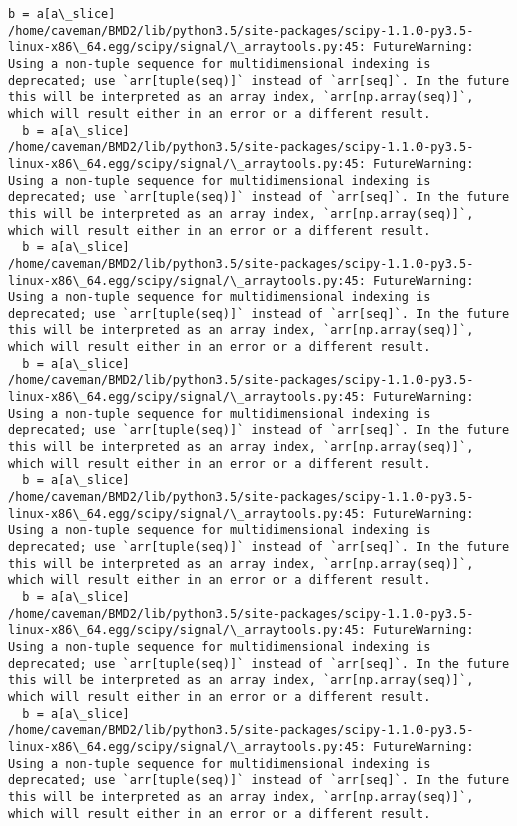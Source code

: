 \documentclass[11pt]{article}
\begin{document}
\begin{Verbatim}[commandchars=\\\{\}]
  b = a[a\_slice]
/home/caveman/BMD2/lib/python3.5/site-packages/scipy-1.1.0-py3.5-linux-x86\_64.egg/scipy/signal/\_arraytools.py:45: FutureWarning: Using a non-tuple sequence for multidimensional indexing is deprecated; use `arr[tuple(seq)]` instead of `arr[seq]`. In the future this will be interpreted as an array index, `arr[np.array(seq)]`, which will result either in an error or a different result.
  b = a[a\_slice]
/home/caveman/BMD2/lib/python3.5/site-packages/scipy-1.1.0-py3.5-linux-x86\_64.egg/scipy/signal/\_arraytools.py:45: FutureWarning: Using a non-tuple sequence for multidimensional indexing is deprecated; use `arr[tuple(seq)]` instead of `arr[seq]`. In the future this will be interpreted as an array index, `arr[np.array(seq)]`, which will result either in an error or a different result.
  b = a[a\_slice]
/home/caveman/BMD2/lib/python3.5/site-packages/scipy-1.1.0-py3.5-linux-x86\_64.egg/scipy/signal/\_arraytools.py:45: FutureWarning: Using a non-tuple sequence for multidimensional indexing is deprecated; use `arr[tuple(seq)]` instead of `arr[seq]`. In the future this will be interpreted as an array index, `arr[np.array(seq)]`, which will result either in an error or a different result.
  b = a[a\_slice]
/home/caveman/BMD2/lib/python3.5/site-packages/scipy-1.1.0-py3.5-linux-x86\_64.egg/scipy/signal/\_arraytools.py:45: FutureWarning: Using a non-tuple sequence for multidimensional indexing is deprecated; use `arr[tuple(seq)]` instead of `arr[seq]`. In the future this will be interpreted as an array index, `arr[np.array(seq)]`, which will result either in an error or a different result.
  b = a[a\_slice]
/home/caveman/BMD2/lib/python3.5/site-packages/scipy-1.1.0-py3.5-linux-x86\_64.egg/scipy/signal/\_arraytools.py:45: FutureWarning: Using a non-tuple sequence for multidimensional indexing is deprecated; use `arr[tuple(seq)]` instead of `arr[seq]`. In the future this will be interpreted as an array index, `arr[np.array(seq)]`, which will result either in an error or a different result.
  b = a[a\_slice]
/home/caveman/BMD2/lib/python3.5/site-packages/scipy-1.1.0-py3.5-linux-x86\_64.egg/scipy/signal/\_arraytools.py:45: FutureWarning: Using a non-tuple sequence for multidimensional indexing is deprecated; use `arr[tuple(seq)]` instead of `arr[seq]`. In the future this will be interpreted as an array index, `arr[np.array(seq)]`, which will result either in an error or a different result.
  b = a[a\_slice]
/home/caveman/BMD2/lib/python3.5/site-packages/scipy-1.1.0-py3.5-linux-x86\_64.egg/scipy/signal/\_arraytools.py:45: FutureWarning: Using a non-tuple sequence for multidimensional indexing is deprecated; use `arr[tuple(seq)]` instead of `arr[seq]`. In the future this will be interpreted as an array index, `arr[np.array(seq)]`, which will result either in an error or a different result.

\end{Verbatim}
\end{document}
